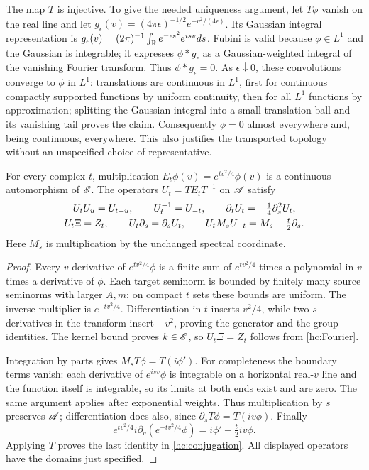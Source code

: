 The map $T$ is injective. To give the needed uniqueness argument,
let $T\phi$ vanish on the real line and let
$g_\epsilon(v)=(4\pi\epsilon)^{-1/2}e^{-v^2/(4\epsilon)}$.
Its Gaussian integral representation is
$g_\epsilon(v)=(2\pi)^{-1}\int_\mathbb R e^{-\epsilon s^2}e^{isv}ds$.
Fubini is valid because $\phi\in L^1$ and the Gaussian is integrable;
it expresses $\phi*g_\epsilon$ as a Gaussian-weighted integral of the
vanishing Fourier transform. Thus $\phi*g_\epsilon=0$.
As $\epsilon\downarrow0$, these convolutions converge to $\phi$ in
$L^1$: translations are continuous in $L^1$, first for continuous
compactly supported functions by uniform continuity, then for all
$L^1$ functions by approximation; splitting the Gaussian integral
into a small translation ball and its vanishing tail proves the claim.
Consequently $\phi=0$ almost everywhere and, being continuous, everywhere.
This also justifies the transported topology without an unspecified
choice of representative.

\begin{proposition}
For every complex $t$, multiplication
$E_t\phi(v)=e^{tv^2/4}\phi(v)$ is a continuous automorphism of $\mathscr E$.
The operators $U_t=TE_tT^{-1}$ on $\mathscr A$ satisfy
\begin{gather}
U_tU_u=U_{t+u},\qquad U_t^{-1}=U_{-t},\qquad
\partial_tU_t=-\tfrac14\partial_s^2U_t,\notag\\
U_t\Xi=Z_t,\qquad U_t\partial_s=\partial_s U_t,\qquad
U_tM_sU_{-t}=M_s-\tfrac t2\partial_s. \label{hc:conjugation}
\end{gather}
Here $M_s$ is multiplication by the unchanged spectral coordinate.
\end{proposition}
\begin{proof}
Every $v$ derivative of $e^{tv^2/4}\phi$ is a finite sum of
$e^{tv^2/4}$ times a polynomial in $v$ times a derivative of $\phi$.
Each target seminorm is bounded by finitely many source seminorms
with larger $A,m$; on compact $t$ sets these bounds are uniform.
The inverse multiplier is $e^{-tv^2/4}$. Differentiation in $t$
inserts $v^2/4$, while two $s$ derivatives in the transform insert
$-v^2$, proving the generator and the group identities.
The kernel bound proves $k\in\mathscr E$, so $U_t\Xi=Z_t$ follows from
\eqref{hc:Fourier}.

Integration by parts gives $M_sT\phi=T(i\phi')$.
For completeness the boundary terms vanish: each derivative of
$e^{isv}\phi$ is integrable on a horizontal real-$v$ line and the
function itself is integrable, so its limits at both ends exist and
are zero. The same argument applies after exponential weights.
Thus multiplication by $s$ preserves $\mathscr A$; differentiation does also,
since $\partial_sT\phi=T(iv\phi)$.
Finally
\[
e^{tv^2/4}i\partial_v(e^{-tv^2/4}\phi)
   =i\phi'-\tfrac t2iv\phi.
\]
Applying $T$ proves the last identity in \eqref{hc:conjugation}.
All displayed operators have the domains just specified.
\end{proof}

